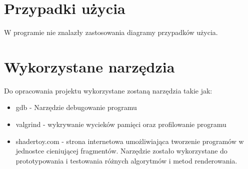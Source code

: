 \section{Przypadki użycia}
W programie nie znalazły zastosowania diagramy przypadków użycia.
\section{Wykorzystane narzędzia}

Do opracowania projektu wykorzystane zostaną narzędzia takie jak:
\begin{itemize}
\item gdb - Narzędzie  debugowanie programu
  \item valgrind - wykrywanie wycieków pamięci oraz profilowanie programu
\item shadertoy.com - strona internetowa umożliwiająca tworzenie programów w jednostce cieniującej fragmentów. Narzędzie zostało wykorzystane do prototypowania i testowania różnych algorytmów i metod renderowania.
\end{itemize}

